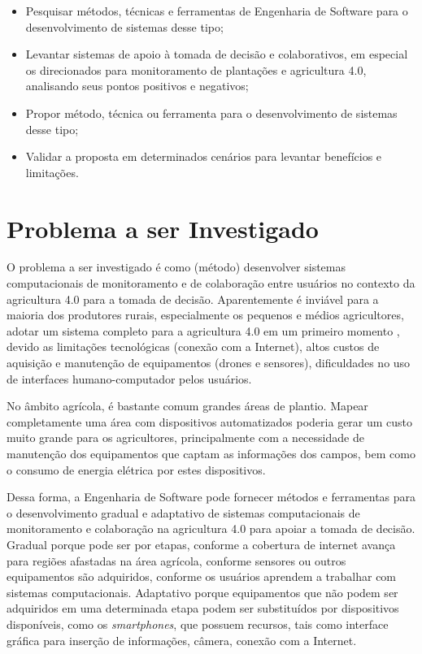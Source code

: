 \documentclass[12pt]{article}
\begin{document}
\begin{itemize}
	\item Pesquisar métodos, técnicas e ferramentas de Engenharia de Software para o desenvolvimento de sistemas desse tipo;
	\item Levantar sistemas de apoio à tomada de decisão e colaborativos, em especial os direcionados para monitoramento de plantações e agricultura 4.0, analisando seus pontos positivos e negativos;
	\item Propor método, técnica ou ferramenta para o desenvolvimento de sistemas desse tipo;
	\item Validar a proposta em determinados cenários para levantar benefícios e limitações.
\end{itemize}

\section{Problema a ser Investigado}
\label{sec:problema_investigado}

O problema a ser investigado é como (método) desenvolver sistemas computacionais de monitoramento e de colaboração entre usuários no contexto da agricultura 4.0 para a tomada de decisão. Aparentemente é inviável para a maioria dos produtores rurais, especialmente os pequenos e médios agricultores, adotar um sistema completo para a agricultura 4.0 em um primeiro momento \cite{Rose:2019}, devido as limitações tecnológicas (conexão com a Internet), altos custos de aquisição e manutenção de equipamentos (drones e sensores), dificuldades no uso de interfaces humano-computador pelos usuários.

No âmbito agrícola, é bastante comum grandes áreas de plantio. Mapear completamente uma área com dispositivos automatizados poderia gerar um custo muito grande para os agricultores, principalmente com a necessidade de manutenção dos equipamentos que captam as informações dos campos, bem como o consumo de energia elétrica por estes dispositivos.

Dessa forma, a Engenharia de Software pode fornecer métodos e ferramentas para o desenvolvimento gradual e adaptativo de sistemas computacionais de monitoramento e colaboração na agricultura 4.0 para apoiar a tomada de decisão. Gradual porque pode ser por etapas, conforme a cobertura de internet avança para regiões afastadas na área agrícola, conforme sensores ou outros equipamentos são adquiridos, conforme os usuários aprendem a trabalhar com sistemas computacionais. Adaptativo porque equipamentos que não podem ser adquiridos em uma determinada etapa podem ser substituídos por dispositivos disponíveis, como os \textit{smartphones}, que possuem recursos, tais como interface gráfica para inserção de informações, câmera, conexão com a Internet.
\end{document}

